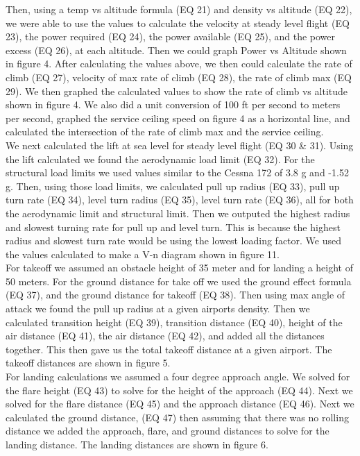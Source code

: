\documentclass[12pt,A4paper]{article}
\begin{document}
	\indent Then, using a temp vs altitude formula (EQ 21) and density vs altitude (EQ 22), we were able to use the values to calculate the velocity at steady level flight (EQ 23), the power required (EQ 24), the power available (EQ 25), and the power excess (EQ 26), at each altitude. Then we could graph Power vs Altitude shown in figure 4. After calculating the values above, we then could calculate the rate of climb (EQ 27), velocity of max rate of climb (EQ 28), the rate of climb max (EQ 29). We then graphed the calculated values to show the rate of climb vs altitude shown in figure 4. We also did a unit conversion of 100 ft per second to meters per second, graphed the service ceiling speed on figure 4 as a horizontal line, and calculated the intersection of the rate of climb max and the service ceiling. \\
	\indent We next calculated the lift at sea level for steady level flight (EQ 30 \& 31). Using the lift calculated we found the aerodynamic load limit (EQ 32). For the structural load limits we used values similar to the Cessna 172 of 3.8 g and -1.52 g.  Then, using those load limits, we calculated pull up radius (EQ 33), pull up turn rate (EQ 34), level turn radius (EQ 35), level turn rate (EQ 36), all for both the aerodynamic limit and structural limit. Then we outputed the highest radius and slowest turning rate for pull up and level turn. This is because the highest radius and slowest turn rate would be using the lowest loading factor. We used the values calculated to make a V-n diagram shown in figure 11. \\
	\indent For takeoff we assumed an obstacle height of 35 meter and for landing a height of 50 meters. For the ground distance for take off we used the ground effect formula (EQ 37), and the ground distance for takeoff (EQ 38). Then using max angle of attack we found the pull up radius at a given airports density. Then we calculated transition height (EQ 39), transition distance (EQ 40), height of the air distance (EQ 41), the air distance (EQ 42), and added all the distances together. This then gave us the total takeoff distance at a given airport. The takeoff distances are shown in figure 5. \\
	\indent For landing calculations we assumed a four degree approach angle. We solved for the flare height (EQ 43) to solve for the height of the approach (EQ 44). Next we solved for the flare distance (EQ 45) and the approach distance (EQ 46).  Next we calculated the ground distance, (EQ 47) then assuming that there was no rolling distance we added  the approach, flare, and ground distances to solve for the landing distance. The landing distances are shown in figure 6. \\
	
\end{document}
